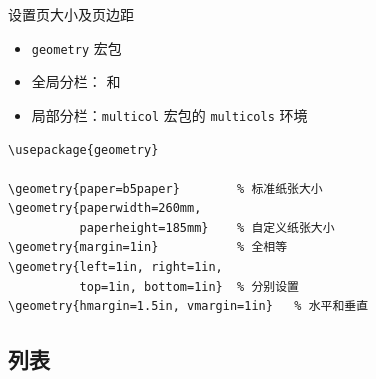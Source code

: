 \begin{frame}[fragile]{设置页大小及页边距}
  \begin{itemize}
      \item \texttt{geometry} 宏包
      \item 全局分栏：\texttt{\twocolumn} 和 \texttt{\onecolumn}
      \item 局部分栏：\texttt{multicol} 宏包的 \texttt{multicols} 环境
  \end{itemize}
  \begin{verbatim}
\usepackage{geometry}

\geometry{paper=b5paper}        % 标准纸张大小
\geometry{paperwidth=260mm,
          paperheight=185mm}    % 自定义纸张大小
\geometry{margin=1in}           % 全相等
\geometry{left=1in, right=1in,
          top=1in, bottom=1in}  % 分别设置
\geometry{hmargin=1.5in, vmargin=1in}   % 水平和垂直
  \end{verbatim}
\end{frame}
  
\subsection{列表}

